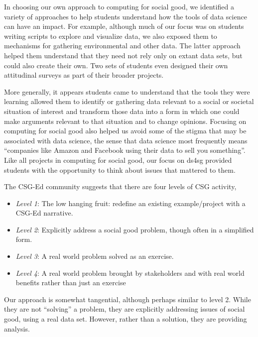In choosing our own approach to computing for social good, we
identified a variety of approaches to help students understand how
the tools of data science can have an impact.  For example, although
much of our focus was on students writing scripts to explore and
visualize data, we also exposed them to mechanisms for gathering
environmental and other data.  The latter approach helped them
understand that they need not rely only on extant data sets, but
could also create their own.  Two sets of students even designed
their own attitudinal surveys as part of their broader projects.

More generally, it appears students came to understand that the
tools they were learning allowed them to identify or gathering data
relevant to a social or societal situation of interest and transform
those data into a form in which one could make arguments relevant
to that situation and to change opinions.  Focusing on computing
for social good also helped us avoid some of the stigma that may
be associated with data science, the sense that data science most
frequently means ``companies like Amazon and Facebook using their
data to sell you something''.  Like all projects in computing for
social good, our focus on ds4sg provided students with the opportunity
to think about issues that mattered to them.

The CSG-Ed community suggests that there are four levels of CSG
activity,\cite{Goldweber2018}

\begin{itemize}
\item \textit{Level 1}: The low hanging fruit: redefine an existing
  example/project with a CSG-Ed narrative.
\item \textit{Level 2}: Explicitly address a social good problem,
  though often in a simplified form.
\item \textit{Level 3}: A real world problem solved as an
  exercise.
\item \textit{Level 4}: A real world problem brought by stakeholders
  and with real world benefits rather than just an exercise
\end{itemize}

Our approach is somewhat tangential, although perhaps similar to
level 2.  While they are not ``solving'' a problem, they are
explicitly addressing issues of social good, using a real data set.
However, rather than a solution, they are providing analysis.

\newcommand{\afk}[1]{\textit{#1}}
\newcommand{\proj}[1]{\textit{\textbf{#1}}}


